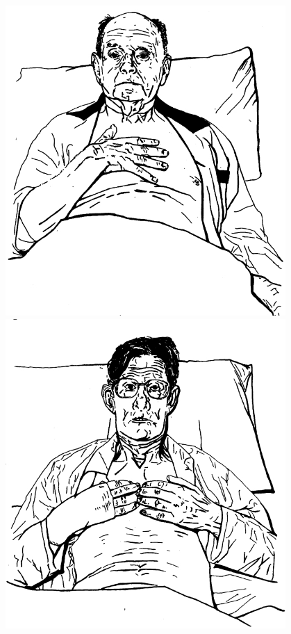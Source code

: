 \begin{frame}
\begin{figure}[!ht]
\begin{minipage}[t]{0.24\textwidth}
          \includegraphics[width=0.95\textwidth]{images/cardiac2.jpg}
        \end{minipage}
        \hfill
        \begin{minipage}[t]{0.24\textwidth}
          \includegraphics[width=0.95\textwidth]{images/cardiac3.jpg}
        \end{minipage}
        \label{fig:Edmondstone1995CardiacCP}
      \end{figure}
    \end{frame}

